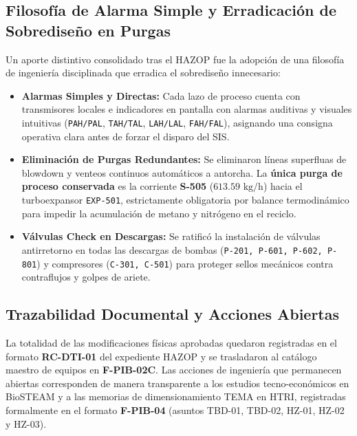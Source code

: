 \documentclass[10pt,letterpaper]{article}
\begin{document}
\subsection{Filosofía de Alarma Simple y Erradicación de Sobrediseño en Purgas}
Un aporte distintivo consolidado tras el HAZOP fue la adopción de una filosofía de ingeniería disciplinada que erradica el sobrediseño innecesario:
\begin{itemize}
    \item \textbf{Alarmas Simples y Directas:} Cada lazo de proceso cuenta con transmisores locales e indicadores en pantalla con alarmas auditivas y visuales intuitivas (\texttt{PAH/PAL}, \texttt{TAH/TAL}, \texttt{LAH/LAL}, \texttt{FAH/FAL}), asignando una consigna operativa clara antes de forzar el disparo del SIS.
    \item \textbf{Eliminación de Purgas Redundantes:} Se eliminaron líneas superfluas de blowdown y venteos continuos automáticos a antorcha. La \textbf{única purga de proceso conservada} es la corriente \textbf{S-505} ($613.59\text{ kg/h}$) hacia el turboexpansor \texttt{EXP-501}, estrictamente obligatoria por balance termodinámico para impedir la acumulación de metano y nitrógeno en el reciclo.
    \item \textbf{Válvulas Check en Descargas:} Se ratificó la instalación de válvulas antirretorno en todas las descargas de bombas (\texttt{P-201, P-601, P-602, P-801}) y compresores (\texttt{C-301, C-501}) para proteger sellos mecánicos contra contraflujos y golpes de ariete.
\end{itemize}

\subsection{Trazabilidad Documental y Acciones Abiertas}
La totalidad de las modificaciones físicas aprobadas quedaron registradas en el formato \textbf{RC-DTI-01} del expediente HAZOP y se trasladaron al catálogo maestro de equipos en \textbf{F-PIB-02C}. Las acciones de ingeniería que permanecen abiertas corresponden de manera transparente a los estudios tecno-económicos en BioSTEAM y a las memorias de dimensionamiento TEMA en HTRI, registradas formalmente en el formato \textbf{F-PIB-04} (asuntos TBD-01, TBD-02, HZ-01, HZ-02 y HZ-03).

\newpage
\end{document}
